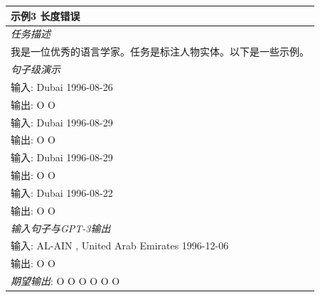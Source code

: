 \documentclass[supercite]{Experimental_Report}
\theoremstyle{definition}
\begin{document}
\begin{table}[th!]
{\begin{tabular}{l}
\textbf{示例3 {\color{red} 长度错误}} \\\midrule
       	\textit{任务描述} \\
我是一位优秀的语言学家。任务是标注人物实体。以下是一些示例。 \\\midrule
\textit{句子级演示} \\
输入: Dubai 1996-08-26 \\
输出: O O \\
输入: Dubai 1996-08-29 \\
输出: O O \\
输入: Dubai 1996-08-29 \\
输出: O O \\
输入: Dubai 1996-08-22 \\
输出: O O \\\midrule
\textit{输入句子与GPT-3输出} \\
输入: AL-AIN , United Arab Emirates 1996-12-06 \\
输出: O O \\
{\color{blue}\it 期望输出}: O O O O O O \\\bottomrule


\end{tabular}}
\end{table}
\end{document}

